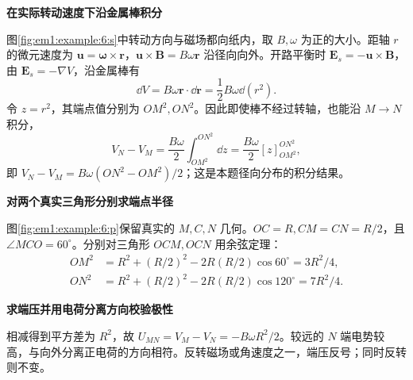 \begin{solution}\textbf{在实际转动速度下沿金属棒积分}\par\nobreak
图\ref{fig:em1:example:6:s}中转动方向与磁场都向纸内，取 $B,\omega$ 为正的大小。距轴 $r$ 的微元速度为 $\bm u=\bm\omega\times\bm r$，$\bm u\times\bm B=B\omega\bm r$ 沿径向向外。开路平衡时 $\bm E_s=-\bm u\times\bm B$，由 $\bm E_s=-\nabla V$，沿金属棒有
\[\dd V=B\omega\bm r\cdot\dd\bm r=\frac12B\omega\dd(r^2).\]
令 $z=r^2$，其端点值分别为 $OM^2,ON^2$。因此即使棒不经过转轴，也能沿 $M\to N$ 积分，
\[
V_N-V_M=\frac{B\omega}{2}\int_{OM^2}^{ON^2}\dd z
=\frac{B\omega}{2}[z]_{OM^2}^{ON^2},
\]
即 $V_N-V_M=B\omega(ON^2-OM^2)/2$；这是本题径向分布的积分结果。



\par\medskip{}\noindent\textbf{对两个真实三角形分别求端点半径}\par\nobreak
图\ref{fig:em1:example:6:p}保留真实的 $M,C,N$ 几何。$OC=R,CM=CN=R/2$，且 $\angle MCO=60^\circ$。分别对三角形 $OCM,OCN$ 用余弦定理：
\begin{align*}OM^2&=R^2+(R/2)^2-2R(R/2)\cos60^\circ=3R^2/4,\\ON^2&=R^2+(R/2)^2-2R(R/2)\cos120^\circ=7R^2/4.\end{align*}


\par\medskip{}\noindent\textbf{求端压并用电荷分离方向校验极性}\par\nobreak
相减得到平方差为 $R^2$，故 $U_{MN}=V_M-V_N=-B\omega R^2/2$。较远的 $N$ 端电势较高，与向外分离正电荷的方向相符。反转磁场或角速度之一，端压反号；同时反转则不变。\end{solution}
